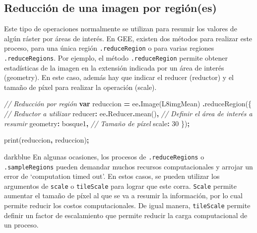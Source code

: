 \documentclass[
  12pt,
  letterpaper,
  twoside]{book}
\newenvironment{Shaded}{\begin{snugshade}}{\end{snugshade}}
\newcommand{\AttributeTok}[1]{\textcolor[rgb]{0.77,0.63,0.00}{#1}}
\newcommand{\CommentTok}[1]{\textcolor[rgb]{0.56,0.35,0.01}{\textit{#1}}}
\newcommand{\DataTypeTok}[1]{\textcolor[rgb]{0.13,0.29,0.53}{#1}}
\newcommand{\DecValTok}[1]{\textcolor[rgb]{0.00,0.00,0.81}{#1}}
\newcommand{\FunctionTok}[1]{\textcolor[rgb]{0.00,0.00,0.00}{#1}}
\newcommand{\KeywordTok}[1]{\textcolor[rgb]{0.13,0.29,0.53}{\textbf{#1}}}
\newcommand{\NormalTok}[1]{#1}
\newcommand{\OperatorTok}[1]{\textcolor[rgb]{0.81,0.36,0.00}{\textbf{#1}}}
\newcommand{\StringTok}[1]{\textcolor[rgb]{0.31,0.60,0.02}{#1}}
\begin{document}
\hypertarget{reducciuxf3n-de-una-imagen-por-regiuxf3nes}{%
\subsection*{Reducción de una imagen por región(es)}\label{reducciuxf3n-de-una-imagen-por-regiuxf3nes}}

Este tipo de operaciones normalmente se utilizan para resumir los valores de algún ráster por áreas de interés. En GEE, existen dos métodos para realizar este proceso, para una única región \texttt{.reduceRegion} o para varias regiones \texttt{.reduceRegions}. Por ejemplo, el método \texttt{.reduceRegion} permite obtener estadísticas de la imagen en la extensión indicada por un área de interés (geometry). En este caso, además hay que indicar el reducer (reductor) y el tamaño de píxel para realizar la operación (scale).

\begin{Shaded}
\begin{Highlighting}[]
\CommentTok{// Reducción por región}
\KeywordTok{var}\NormalTok{ reduccion }\OperatorTok{=}\NormalTok{ ee}\OperatorTok{.}\FunctionTok{Image}\NormalTok{(L8imgMean)}
  \OperatorTok{.}\FunctionTok{reduceRegion}\NormalTok{(\{}
    \CommentTok{// Reductor a utilizar}
    \DataTypeTok{reducer}\OperatorTok{:}\NormalTok{ ee}\OperatorTok{.}\AttributeTok{Reducer}\OperatorTok{.}\FunctionTok{mean}\NormalTok{()}\OperatorTok{,}
    \CommentTok{// Definir el área de interés a resumir}
    \DataTypeTok{geometry}\OperatorTok{:}\NormalTok{ bosque1}\OperatorTok{,}
    \CommentTok{// Tamaño de píxel}
    \DataTypeTok{scale}\OperatorTok{:} \DecValTok{30}
\NormalTok{  \})}\OperatorTok{;}
  
\FunctionTok{print}\NormalTok{(reduccion}\OperatorTok{,} \StringTok{\textquotesingle{}reduccion\textquotesingle{}}\NormalTok{)}\OperatorTok{;}
\end{Highlighting}
\end{Shaded}

\begin{bluebox2}

\begin{awesomeblock}{5pt}{\faLightbulb}{darkblue}
En algunas ocasiones, los procesos de \texttt{.reduceRegions} o \texttt{.sampleRegions} pueden demandar muchos recursos computacionales y arrojar un error de `computation timed out'. En estos casos, se pueden utilizar los argumentos de \texttt{scale} o \texttt{tileScale} para lograr que este corra. \texttt{Scale} permite aumentar el tamaño de píxel al que se va a resumir la información, por lo cual permite reducir los costos computacionales. De igual manera, \texttt{tileScale} permite definir un factor de escalamiento que permite reducir la carga computacional de un proceso.

\end{awesomeblock}

\end{bluebox2}
\end{document}
